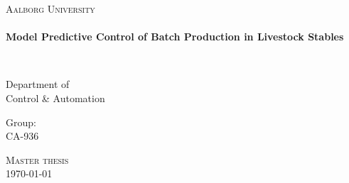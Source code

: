 \thispagestyle{empty}

\begin{center}

\vspace*{\fill}

\textsc{\LARGE Aalborg University}\\[1.0cm]

\HRule \\[0.4cm]
{ \HUGE \bfseries  Model Predictive Control of Batch Production in Livestock Stables \\[0.5cm] }

\HRule \\[1.5cm]%

\begin{minipage}{0.4\textwidth}
\begin{flushleft} \large
Department of\\
Control \& Automation
\end{flushleft}
\end{minipage}
\begin{minipage}{0.4\textwidth}
\begin{flushright} \large
Group: \\
CA-936
\end{flushright}
\end{minipage}

\vspace*{\fill}

\textsc{\Large Master thesis}\\[1.0cm]

{\large \today}

\end{center}